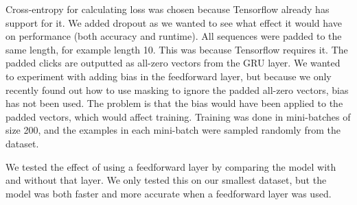 Cross-entropy for calculating loss was chosen because Tensorflow already has support for it. We added dropout as we wanted to see what effect it would have on performance (both accuracy and runtime). All sequences were padded to the same length, for example length 10. This was because Tensorflow requires it. The padded clicks are outputted as all-zero vectors from the GRU layer. We wanted to experiment with adding bias in the feedforward layer, but because we only recently found out how to use masking to ignore the padded all-zero vectors, bias has not been used. The problem is that the bias would have been applied to the padded vectors, which would affect training. Training was done in mini-batches of size 200, and the examples in each mini-batch were sampled randomly from the dataset.

We tested the effect of using a feedforward layer by comparing the model with and without that layer. We only tested this on our smallest dataset, but the model was both faster and more accurate when a feedforward layer was used. 
